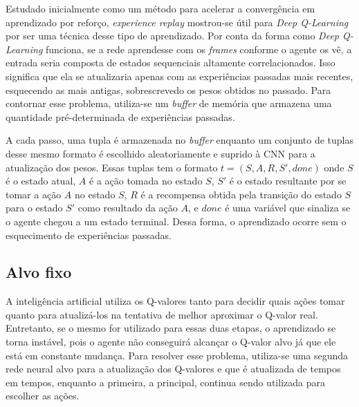 Estudado inicialmente como um método para acelerar a convergência em aprendizado por reforço, \textit{experience replay} mostrou-se útil para \textit{Deep Q-Learning} por ser uma técnica desse tipo de aprendizado.
Por conta da forma como \textit{Deep Q-Learning} funciona, se a rede aprendesse com os \textit{frames} conforme o agente os vê, a entrada seria composta de estados sequenciais altamente correlacionados.
Isso significa que ela se atualizaria apenas com as experiências passadas mais recentes, esquecendo as mais antigas, sobrescrevedo os pesos obtidos no passado.
Para contornar esse problema, utiliza-se um \textit{buffer} de memória que armazena uma quantidade pré-determinada de experiências passadas.

A cada passo, uma tupla é armazenada no \textit{buffer} enquanto um conjunto de tuplas desse mesmo formato é escolhido aleatoriamente e suprido à CNN para a atualização dos pesos.
Essas tuplas tem o formato $t = (S, A, R, S', done)$ onde $S$ é o estado atual, $A$ é a ação tomada no estado $S$, $S'$ é o estado resultante por se tomar a ação $A$ no estado $S$, $R$ é a recompensa obtida pela transição do estado $S$ para o estado $S'$ como resultado da ação $A$, e $done$ é uma variável que sinaliza se o agente chegou a um estado terminal.
Dessa forma, o aprendizado ocorre sem o esquecimento de experiências passadas.


\subsection{Alvo fixo}
\label{sec:ft}

A inteligência artificial utiliza os Q-valores tanto para decidir quais ações tomar quanto para atualizá-los na tentativa de melhor aproximar o Q-valor real.
Entretanto, se o mesmo for utilizado para essas duas etapas, o aprendizado se torna instável, pois o agente não conseguirá alcançar o Q-valor alvo já que ele está em constante mudança.
Para resolver esse problema, utiliza-se uma segunda rede neural alvo para a atualização dos Q-valores e que é atualizada de tempos em tempos, enquanto a primeira, a principal, continua sendo utilizada para escolher as ações.

